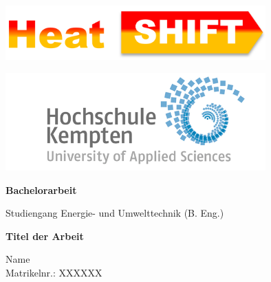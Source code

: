\thispagestyle{empty}


\vspace*{-10mm}

\begin{minipage}[t]{0.5\textwidth}
	\begin{flushleft}
		\includegraphics[width=0.75\textwidth]{./abbildungen/heatshift_logo.pdf}
	\end{flushleft}
\end{minipage}
\hfill%
\begin{minipage}[t]{0.5\textwidth}%
	\begin{flushright}
		\includegraphics[width=0.75\textwidth]{./abbildungen/LogoHS.png}
	\end{flushright}
\end{minipage}

\vspace*{3.5cm}

\begin{center}
{\Large \textbf{Bachelorarbeit}}\\ 

\vspace*{1cm}

{\large Studiengang Energie- und Umwelttechnik (B. Eng.)\\[1mm]}

\vspace{1cm}

{\Large \bfseries Titel der Arbeit\\}


\vspace{1.5cm}

{\large Name}\\
{\large Matrikelnr.: XXXXXX}\\[30mm]

\end{center}
\vfill

